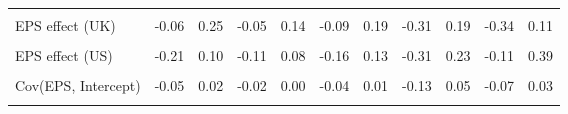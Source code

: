 \begin{table}
\begin{tabular}[t]{lrrrrrrrrrr}
\cellcolor{gray!10}{Intercept (UK)} & \cellcolor{gray!10}{-0.30} & \cellcolor{gray!10}{0.59} & \cellcolor{gray!10}{-0.18} & \cellcolor{gray!10}{0.34} & \cellcolor{gray!10}{-0.31} & \cellcolor{gray!10}{0.48} & \cellcolor{gray!10}{-0.72} & \cellcolor{gray!10}{0.64} & \cellcolor{gray!10}{-0.79} & \cellcolor{gray!10}{0.44}\\
EPS effect (UK) & -0.06 & 0.25 & -0.05 & 0.14 & -0.09 & 0.19 & -0.31 & 0.19 & -0.34 & 0.11\\
\cellcolor{gray!10}{Intercept (US)} & \cellcolor{gray!10}{-0.49} & \cellcolor{gray!10}{0.29} & \cellcolor{gray!10}{-0.25} & \cellcolor{gray!10}{0.20} & \cellcolor{gray!10}{-0.36} & \cellcolor{gray!10}{0.33} & \cellcolor{gray!10}{-0.68} & \cellcolor{gray!10}{0.59} & \cellcolor{gray!10}{-0.36} & \cellcolor{gray!10}{0.83}\\
EPS effect (US) & -0.21 & 0.10 & -0.11 & 0.08 & -0.16 & 0.13 & -0.31 & 0.23 & -0.11 & 0.39\\
\cellcolor{gray!10}{Var(Intercept)} & \cellcolor{gray!10}{0.00} & \cellcolor{gray!10}{0.35} & \cellcolor{gray!10}{0.00} & \cellcolor{gray!10}{0.11} & \cellcolor{gray!10}{0.00} & \cellcolor{gray!10}{0.24} & \cellcolor{gray!10}{0.00} & \cellcolor{gray!10}{1.04} & \cellcolor{gray!10}{0.00} & \cellcolor{gray!10}{0.65}\\
Cov(EPS, Intercept) & -0.05 & 0.02 & -0.02 & 0.00 & -0.04 & 0.01 & -0.13 & 0.05 & -0.07 & 0.03\\
\cellcolor{gray!10}{Var(EPS)} & \cellcolor{gray!10}{0.00} & \cellcolor{gray!10}{0.06} & \cellcolor{gray!10}{0.00} & \cellcolor{gray!10}{0.02} & \cellcolor{gray!10}{0.00} & \cellcolor{gray!10}{0.05} & \cellcolor{gray!10}{0.01} & \cellcolor{gray!10}{0.20} & \cellcolor{gray!10}{0.00} & \cellcolor{gray!10}{0.13}\\
\bottomrule
\end{tabular}
\end{table}
